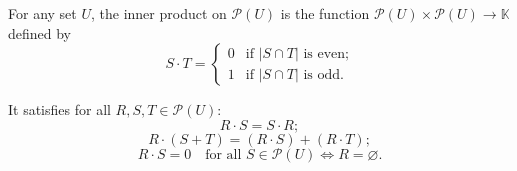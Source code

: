 For any set $U$, the inner product on $\mathcal{P}(U)$ is the function $\mathcal{P}(U) \times \mathcal{P}(U) \rightarrow \mathbb{K}$ defined by
$$S \cdot T = \begin{cases} 0 & \text{if } |S \cap T| \text{ is even;} \\ 1 & \text{if } |S \cap T| \text{ is odd.} \end{cases}$$

It satisfies for all $R, S, T \in \mathcal{P}(U)$:
$$R \cdot S = S \cdot R;$$
$$R \cdot (S + T) = (R \cdot S) + (R \cdot T);$$
$$R \cdot S = 0 \quad \text{for all } S \in \mathcal{P}(U) \Leftrightarrow R = \varnothing.$$
